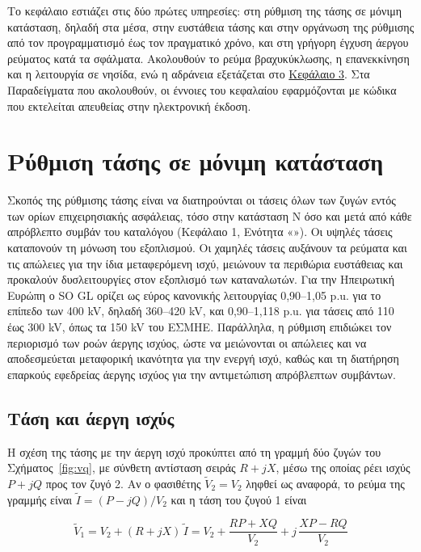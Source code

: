 Το κεφάλαιο εστιάζει στις δύο πρώτες υπηρεσίες: στη ρύθμιση της τάσης σε μόνιμη κατάσταση,
δηλαδή στα μέσα, στην ευστάθεια τάσης και στην οργάνωση της ρύθμισης από τον προγραμματισμό
έως τον πραγματικό χρόνο, και στη γρήγορη έγχυση άεργου ρεύματος κατά τα σφάλματα. Ακολουθούν
το ρεύμα βραχυκύκλωσης, η επανεκκίνηση και η λειτουργία σε νησίδα, ενώ η αδράνεια εξετάζεται
στο \hyperref[kef-03-theoria]{Κεφάλαιο 3}. Στα Παραδείγματα που ακολουθούν, οι έννοιες του
κεφαλαίου εφαρμόζονται με κώδικα που εκτελείται απευθείας στην ηλεκτρονική έκδοση.

\section{Ρύθμιση τάσης σε μόνιμη κατάσταση}
\label{sec:v-control}

Σκοπός της ρύθμισης τάσης είναι να διατηρούνται οι τάσεις όλων των ζυγών εντός των ορίων
επιχειρησιακής ασφάλειας, τόσο στην κατάσταση N όσο και μετά από κάθε απρόβλεπτο συμβάν του
καταλόγου (Κεφάλαιο 1, Ενότητα «»). Οι υψηλές τάσεις καταπονούν τη μόνωση του
εξοπλισμού. Οι χαμηλές τάσεις αυξάνουν τα ρεύματα και τις απώλειες για την ίδια μεταφερόμενη
ισχύ, μειώνουν τα περιθώρια ευστάθειας και προκαλούν δυσλειτουργίες στον εξοπλισμό των
καταναλωτών. Για την Ηπειρωτική Ευρώπη ο SO GL ορίζει ως εύρος κανονικής λειτουργίας
0,90--1,05 p.u. για το επίπεδο των 400 kV, δηλαδή 360--420 kV, και 0,90--1,118 p.u. για τάσεις
από 110 έως 300 kV, όπως τα 150 kV του ΕΣΜΗΕ. Παράλληλα, η ρύθμιση επιδιώκει τον περιορισμό
των ροών άεργης ισχύος, ώστε να μειώνονται οι απώλειες και να αποδεσμεύεται μεταφορική
ικανότητα για την ενεργή ισχύ, καθώς και τη διατήρηση επαρκούς εφεδρείας άεργης ισχύος για
την αντιμετώπιση απρόβλεπτων συμβάντων.

\subsection{Τάση και άεργη ισχύς}
\label{sec:v-q}

Η σχέση της τάσης με την άεργη ισχύ προκύπτει από τη γραμμή δύο ζυγών του
Σχήματος~\ref{fig:vq}, με σύνθετη αντίσταση σειράς $R + jX$, μέσω της οποίας ρέει ισχύς
$P + jQ$ προς τον ζυγό 2. Αν ο φασιθέτης $\tilde{V}_2 = V_2$ ληφθεί ως αναφορά, το ρεύμα της
γραμμής είναι $\tilde{I} = (P - jQ)/V_2$ και η τάση του ζυγού 1 είναι

\begin{equation}
\tilde{V}_1 = V_2 + (R + jX)\,\tilde{I}
= V_2 + \frac{RP + XQ}{V_2} + j\,\frac{XP - RQ}{V_2}
\label{eq:v1phasor}
\end{equation}

